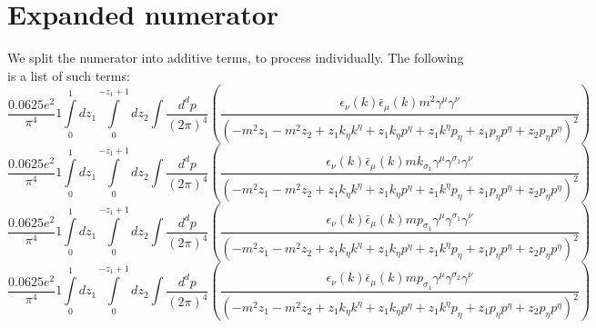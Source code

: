 \section*{Expanded numerator}
We split the numerator into additive terms, to process individually.  The following is a list of such terms:
\begin{dmath}\frac{0.0625 e^{2}}{\pi^{4}}1\int\limits_{ 0 }^{ 1 } d{ z_{ 1 } }\int\limits_{ 0 }^{ - { z_{ 1 } } + 1 } d{ z_{ 2 } }\int\frac{d^d p }{ (2\pi)^4 }\left(\frac{\epsilon_{ \nu }({ k }) \bar{\epsilon}_{ \mu }({ k }) m^{2} { \gamma^{ \mu } } { \gamma^{ \nu } }}{\left(- m^{2} { z_{ 1 } } - m^{2} { z_{ 2 } } + { z_{ 1 } } { { k }_{ \eta } } { { k }^{ \eta } } + { z_{ 1 } } { { k }_{ \eta } } { { p }^{ \eta } } + { z_{ 1 } } { { k }^{ \eta } } { { p }_{ \eta } } + { z_{ 1 } } { { p }_{ \eta } } { { p }^{ \eta } } + { z_{ 2 } } { { p }_{ \eta } } { { p }^{ \eta } }\right)^{2}}\right)\end{dmath}
\begin{dmath}\frac{0.0625 e^{2}}{\pi^{4}}1\int\limits_{ 0 }^{ 1 } d{ z_{ 1 } }\int\limits_{ 0 }^{ - { z_{ 1 } } + 1 } d{ z_{ 2 } }\int\frac{d^d p }{ (2\pi)^4 }\left(\frac{\epsilon_{ \nu }({ k }) \bar{\epsilon}_{ \mu }({ k }) m { { k }_{ \sigma_1 } } { \gamma^{ \mu } } { \gamma^{ \sigma_1 } } { \gamma^{ \nu } }}{\left(- m^{2} { z_{ 1 } } - m^{2} { z_{ 2 } } + { z_{ 1 } } { { k }_{ \eta } } { { k }^{ \eta } } + { z_{ 1 } } { { k }_{ \eta } } { { p }^{ \eta } } + { z_{ 1 } } { { k }^{ \eta } } { { p }_{ \eta } } + { z_{ 1 } } { { p }_{ \eta } } { { p }^{ \eta } } + { z_{ 2 } } { { p }_{ \eta } } { { p }^{ \eta } }\right)^{2}}\right)\end{dmath}
\begin{dmath}\frac{0.0625 e^{2}}{\pi^{4}}1\int\limits_{ 0 }^{ 1 } d{ z_{ 1 } }\int\limits_{ 0 }^{ - { z_{ 1 } } + 1 } d{ z_{ 2 } }\int\frac{d^d p }{ (2\pi)^4 }\left(\frac{\epsilon_{ \nu }({ k }) \bar{\epsilon}_{ \mu }({ k }) m { { p }_{ \sigma_1 } } { \gamma^{ \mu } } { \gamma^{ \sigma_1 } } { \gamma^{ \nu } }}{\left(- m^{2} { z_{ 1 } } - m^{2} { z_{ 2 } } + { z_{ 1 } } { { k }_{ \eta } } { { k }^{ \eta } } + { z_{ 1 } } { { k }_{ \eta } } { { p }^{ \eta } } + { z_{ 1 } } { { k }^{ \eta } } { { p }_{ \eta } } + { z_{ 1 } } { { p }_{ \eta } } { { p }^{ \eta } } + { z_{ 2 } } { { p }_{ \eta } } { { p }^{ \eta } }\right)^{2}}\right)\end{dmath}
\begin{dmath}\frac{0.0625 e^{2}}{\pi^{4}}1\int\limits_{ 0 }^{ 1 } d{ z_{ 1 } }\int\limits_{ 0 }^{ - { z_{ 1 } } + 1 } d{ z_{ 2 } }\int\frac{d^d p }{ (2\pi)^4 }\left(\frac{\epsilon_{ \nu }({ k }) \bar{\epsilon}_{ \mu }({ k }) m { { p }_{ \sigma_1 } } { \gamma^{ \mu } } { \gamma^{ \sigma_2 } } { \gamma^{ \nu } }}{\left(- m^{2} { z_{ 1 } } - m^{2} { z_{ 2 } } + { z_{ 1 } } { { k }_{ \eta } } { { k }^{ \eta } } + { z_{ 1 } } { { k }_{ \eta } } { { p }^{ \eta } } + { z_{ 1 } } { { k }^{ \eta } } { { p }_{ \eta } } + { z_{ 1 } } { { p }_{ \eta } } { { p }^{ \eta } } + { z_{ 2 } } { { p }_{ \eta } } { { p }^{ \eta } }\right)^{2}}\right)\end{dmath}
